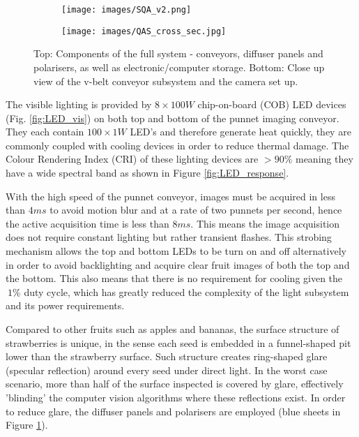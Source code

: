 \documentclass[conference]{IEEEtran}
\begin{document}
\begin{figure}[ht]
	\centering
	\begin{subfigure}{.45\textwidth}
		\centering
		\texttt{[image: images/SQA\_v2.png]}
		\caption{}
		\label{fig:enclosure_cross_sec}
	\end{subfigure}%
	
	\begin{subfigure}{.45\textwidth}
		\centering
		\texttt{[image: images/QAS\_cross\_sec.jpg]}
		\caption{}
		\label{fig:close_up_cross_sec}
	\end{subfigure}%
	
	\caption{Top: Components of the full system - conveyors, diffuser panels and polarisers, as well as electronic/computer storage. Bottom: Close up view of the v-belt conveyor subsystem and the camera set up. }
	\label{fig:full_system}
\end{figure}


The visible lighting is provided by $8 \times 100W$ chip-on-board (COB) LED devices (Fig. \ref{fig:LED_vis}) on both top and bottom of the punnet imaging conveyor. They each contain $100 \times 1W$ LED's and therefore generate heat quickly, they are commonly coupled with cooling devices in order to reduce thermal damage. The Colour Rendering Index (CRI) of these lighting devices are $>90\%$ meaning they have a wide spectral band as shown in Figure \ref{fig:LED_response}.

With the high speed of the punnet conveyor, images must be acquired in less than $4ms$ to avoid motion blur and at a rate of two punnets per second, hence the active acquisition time is less than $8ms$. This means the image acquisition does not require constant lighting but rather transient flashes. This strobing mechanism allows the top and bottom LEDs to be turn on and off alternatively in order to avoid backlighting and acquire clear fruit images of both the top and the bottom. This also means that there is no requirement for cooling given the $~1\%$ duty cycle, which has greatly reduced the complexity of the light subsystem and its power requirements.

Compared to other fruits such as apples and bananas, the surface structure of strawberries is unique, in the sense each seed is embedded in a funnel-shaped pit lower than the strawberry surface. Such structure creates ring-shaped glare (specular reflection) around every seed under direct light. In the worst case scenario, more than half of the surface inspected is covered by glare, effectively 'blinding' the computer vision algorithms where these reflections exist. In order to reduce glare, the diffuser panels and polarisers are employed (blue sheets in Figure \ref{fig:enclosure_cross_sec}).
\end{document}

